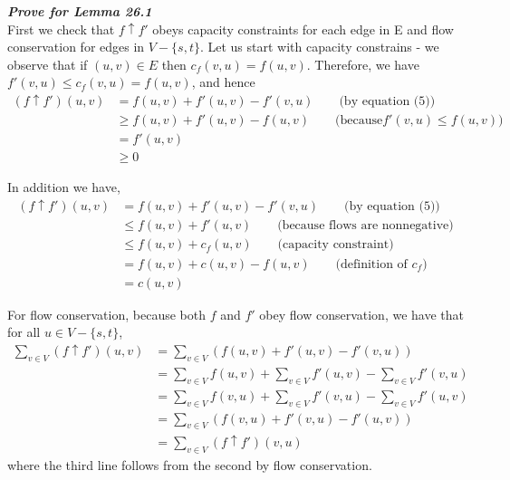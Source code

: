 \documentclass[12pt]{article}
\begin{document}
\textbf{\textit{Prove for Lemma 26.1}}\\
First we check that $f \uparrow f'$ obeys capacity constraints for each edge in E and flow conservation for edges in $V-\{s, t\}$. Let us start with capacity constrains - we observe that if $(u, v) \in E$ then $c_f(v, u) = f(u, v)$. Therefore, we have $f'(v, u) \leq c_f(v, u) = f(u, v)$, and hence 
\begin{align*}
(f \uparrow f')(u, v) &= f(u, v) + f'(u, v) - f'(v, u) \qquad \text{(by equation (5))}\\
&\geq f(u, v) + f'(u, v) - f(u, v) \qquad \text{(because} f'(v, u) \leq f(u, v))\\
&= f'(u, v)\\
&\geq 0 
\end{align*}

In addition we have, 
\begin{align*}
(f \uparrow f')(u, v) &= f(u, v) + f'(u, v) - f'(v, u) \qquad \text{(by equation (5))}\\
&\leq f(u, v) + f'(u, v) \qquad \text{(because flows are nonnegative)}\\
&\leq f(u, v) + c_f(u, v) \qquad \text{(capacity constraint)}\\
&= f(u, v) + c(u, v) - f(u, v) \qquad \text{(definition of } c_f)\\
&= c(u, v) 
\end{align*}

For flow conservation, because both $f$ and $f'$ obey flow conservation, we have that for all $u \in V - \{s, t\}$,
\begin{align*}
\sum_{v \in V} (f \uparrow f')(u, v) &= \sum_{v \in V} (f(u, v) + f'(u, v) - f'(v, u))\\
&= \sum_{v \in V} f(u, v) + \sum_{v \in V} f'(u, v) - \sum_{v \in V} f'(v, u)\\
&= \sum_{v \in V} f(v, u) + \sum_{v \in V} f'(v, u) - \sum_{v \in V} f'(u, v)\\
&= \sum_{v \in V} (f(v, u) + f'(v, u) - f'(u, v))\\
&= \sum_{v \in V} (f \uparrow f')(v, u)
\end{align*}
where the third line follows from the second by flow conservation. \\
\end{document}
